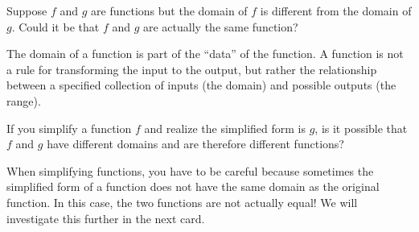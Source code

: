 \documentclass{ximera}
\begin{document}
\begin{problem}
  Suppose $f$ and $g$ are functions but the domain of $f$ is different
  from the domain of $g$.  Could it be that $f$ and $g$ are actually
  the same function?

  \begin{multipleChoice}
  \end{multipleChoice}

  \begin{feedback}
    The domain of a function is part of the ``data'' of the function.
    A function is not a rule for transforming the input to the output,
    but rather the relationship between a specified collection of
    inputs (the domain) and possible outputs (the range).
  \end{feedback}
\end{problem}

\begin{problem}
  If you simplify a function $f$ and realize the simplified form is $g$, is it possible that $f$ and $g$ have different domains and are therefore different functions?

  \begin{multipleChoice}
  \end{multipleChoice}

  \begin{feedback}[correct]
  When simplifying functions, you have to be careful because sometimes the simplified form of a function does not have the same domain as the original function.  In this case, the two functions are not actually equal!  We will investigate this further in the next card.
  \end{feedback}
\end{problem}


 
%
\end{document}
